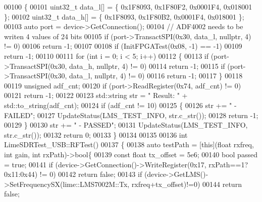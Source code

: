 \begin{DoxyCode}
00100 \{
00101     uint32\_t data\_l[] = \{ 0x1F8093, 0x1F80F2, 0x0001F4, 0x018001 \};
00102     uint32\_t data\_h[] = \{ 0x1F8093, 0x1F80B2, 0x0001F4, 0x018001 \};
00103     \textcolor{keyword}{auto} port = device->GetConnection();
00104     \textcolor{comment}{// ADF4002 needs to be writen 4 values of 24 bits}
00105     \textcolor{keywordflow}{if} (port->TransactSPI(0x30, data\_l, \textcolor{keyword}{nullptr}, 4) != 0)
00106         \textcolor{keywordflow}{return} -1;
00107 
00108     \textcolor{keywordflow}{if} (InitFPGATest(0x08, -1) == -1)
00109         \textcolor{keywordflow}{return} -1;
00110 
00111     \textcolor{keywordflow}{for} (\textcolor{keywordtype}{int} i = 0; i < 5; i++)
00112     \{
00113         \textcolor{keywordflow}{if} (port->TransactSPI(0x30, data\_h, \textcolor{keyword}{nullptr}, 4) != 0)
00114             \textcolor{keywordflow}{return} -1;
00115         \textcolor{keywordflow}{if} (port->TransactSPI(0x30, data\_l, \textcolor{keyword}{nullptr}, 4) != 0)
00116             \textcolor{keywordflow}{return} -1;
00117     \}
00118 
00119     \textcolor{keywordtype}{unsigned} adf\_cnt;
00120     \textcolor{keywordflow}{if} (port->ReadRegister(0x74, adf\_cnt) != 0)
00121         \textcolor{keywordflow}{return} -1;
00122 
00123     std::string str = \textcolor{stringliteral}{"  Result: "} + std::to\_string(adf\_cnt);
00124     \textcolor{keywordflow}{if} (adf\_cnt != 10)
00125     \{
00126             str += \textcolor{stringliteral}{" - FAILED"};
00127             UpdateStatus(LMS_TEST_INFO, str.c\_str());
00128             \textcolor{keywordflow}{return} -1;
00129     \}
00130     str += \textcolor{stringliteral}{" - PASSED"};
00131     UpdateStatus(LMS_TEST_INFO, str.c\_str());
00132     \textcolor{keywordflow}{return} 0;
00133 \}
00134 
00135 
00136 \textcolor{keywordtype}{int} LimeSDRTest_USB::RFTest()
00137 \{
00138     \textcolor{keyword}{auto} testPath = [\textcolor{keyword}{this}](\textcolor{keywordtype}{float} rxfreq, \textcolor{keywordtype}{int} gain, \textcolor{keywordtype}{int} rxPath)->\textcolor{keywordtype}{bool}\{
00139         \textcolor{keyword}{const} \textcolor{keywordtype}{float} tx\_offset = 5e6;
00140         \textcolor{keywordtype}{bool} passed = \textcolor{keyword}{true};
00141         \textcolor{keywordflow}{if} (device->GetConnection()->WriteRegister(0x17, rxPath==1? 0x11:0x44) != 0)
00142             \textcolor{keywordflow}{return} \textcolor{keyword}{false};
00143         \textcolor{keywordflow}{if} (device->GetLMS()->SetFrequencySX(lime::LMS7002M::Tx, rxfreq+tx\_offset)!=0)
00144             \textcolor{keywordflow}{return} \textcolor{keyword}{false};

\end{DoxyCode}
